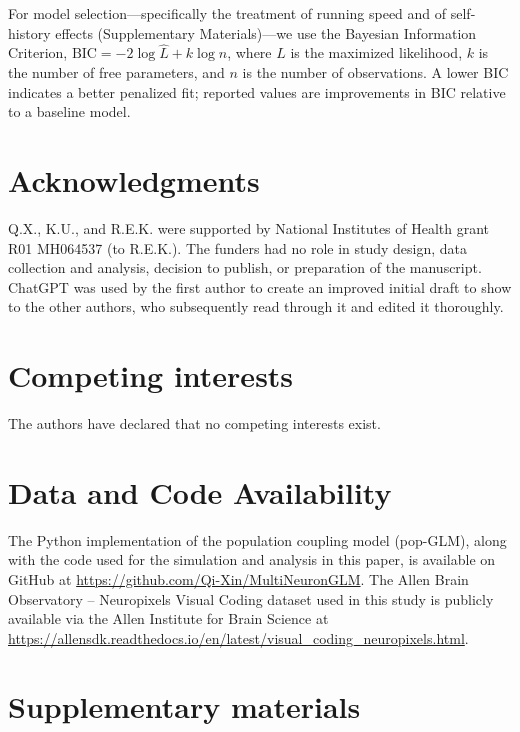\documentclass[12pt]{article}
\begin{document}
For model selection---specifically the treatment of running speed and of self-history effects (Supplementary Materials)---we use the Bayesian Information Criterion, $\text{BIC} = -2\log\hat{L} + k\log n$, where $\hat{L}$ is the maximized likelihood, $k$ is the number of free parameters, and $n$ is the number of observations. A lower BIC indicates a better penalized fit; reported values are improvements in BIC relative to a baseline model.

\section*{Acknowledgments}
Q.X., K.U., and R.E.K. were supported by National Institutes of Health grant R01 MH064537 (to R.E.K.). The funders had no role in study design, data collection and analysis, decision to publish, or preparation of the manuscript. 
ChatGPT was used by the first author to create an improved initial draft to show to the other authors, who subsequently read through it and edited it thoroughly.

\section*{Competing interests}
The authors have declared that no competing interests exist.

\section*{Data and Code Availability}

The Python implementation of the population coupling model (pop-GLM), along with the code used for the simulation and analysis in this paper, is available on GitHub at \url{https://github.com/Qi-Xin/MultiNeuronGLM}. The Allen Brain Observatory – Neuropixels Visual Coding dataset used in this study is publicly available via the Allen Institute for Brain Science at \url{https://allensdk.readthedocs.io/en/latest/visual_coding_neuropixels.html}.




\newcommand{\beginsupplement}{%
        \setcounter{table}{0}
        \renewcommand{\thetable}{S\arabic{table}}%
        \setcounter{figure}{0}
        \renewcommand{\thefigure}{S\arabic{figure}}%
     }
\beginsupplement

\newpage


\section*{Supplementary materials}
\end{document}
